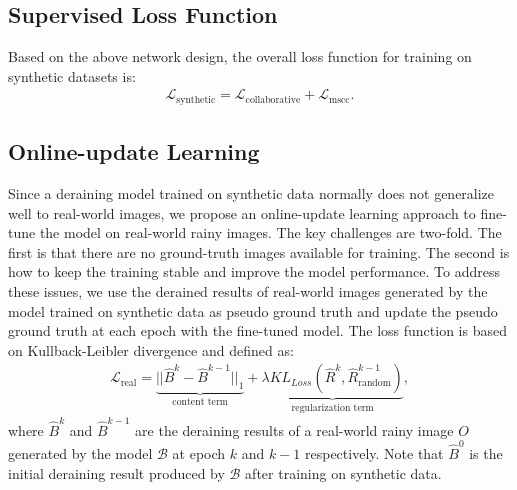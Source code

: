 \documentclass[letterpaper]{article} %
\begin{document}
\subsection{Supervised Loss Function}\label{Loss Function on Synthetic Datasets}
%
Based on the above network design, the overall loss function for training on synthetic datasets is:
\begin{equation}
\begin{array}{ll}
\mathcal{L}_{\text{synthetic}} = {\mathcal{L}_{\text{collaborative}}}+ {\mathcal{L}_{\text{mscc}}}.
\end{array}
\label{eq:n0}
\end{equation}
%


\subsection{Online-update Learning}\label{sec: Online Updating Scheme}
%
Since a deraining model trained on synthetic data normally does not generalize well to real-world images, we propose an online-update learning approach to fine-tune the model on real-world rainy images.
%
The key challenges are two-fold. The first is that there are no ground-truth images available for training.
The second is how to keep the training stable and improve the model performance.
To address these issues, we use the derained results of real-world images generated by the model trained on synthetic data as pseudo ground truth and update the pseudo ground truth at each epoch with the fine-tuned model. The loss function is based on Kullback-Leibler divergence and defined as:
\begin{equation}
\begin{array}{ll}
\mathcal{L}_{\text{real}} = \underbrace{||\hat{B}^{k}- \hat{B}^{k-1}||_{1}}_{\text{content term}} +
\underbrace{{\lambda KL_{Loss}(\hat{R}^{k}, \hat{R}^{k-1}_{\text{random}})}}_{\text{regularization term}},
\end{array}
\label{eq:real-world}
\end{equation}
where $\hat{B}^{k}$ and $\hat{B}^{k-1}$ are the deraining results of a real-world rainy image $O$ generated by the model $\mathcal{B}$ at epoch $k$ and $k-1$ respectively. Note that $\hat{B}^{0}$ is the initial deraining result produced by $\mathcal{B}$ after training on synthetic data.
\end{document}
